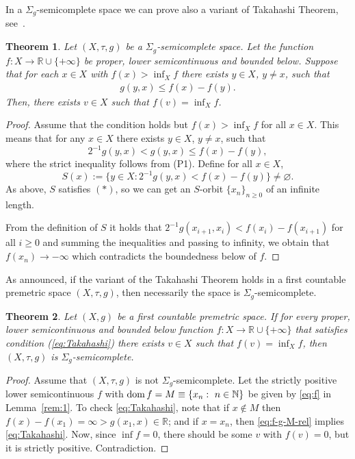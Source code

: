 \documentclass[12pt]{article}
\newtheorem{theorem}{Theorem}[section]
\def\dom{\mathop{\rm dom}}
\newcommand{\R}{\mathbb{R}}
\begin{document}
In a $\Sigma_g$-semicomplete space we can prove also a variant of Takahashi Theorem, see~\cite{Takahashi}.

\begin{theorem}\label{th:Takahashi} Let $(X,\tau,g)$ be a $\Sigma_g$-semicomplete space. Let the function $f: X \rightarrow \R \cup \{+\infty\}$ be proper, lower semicontinuous and bounded below. Suppose that for each $x \in X$ with $f(x) > \inf_X f$ there exists $y \in X$, $y \neq x$, such that
\begin{eqnarray}
g(y,x) \leq f(x)-f(y). \label{eq:Takahashi}
\end{eqnarray}
Then, there exists $v \in X$ such that $f(v)=\inf_X f$.
\end{theorem}

\begin{proof}
Assume that the condition holds but $f(x) > \inf_X f$ for all $x \in X$. This means that for any $x\in X$  there exists $y \in X$, $y \neq x$, such that
\[
2^{-1}g(y,x) < g(y,x)\leq f(x)-f(y),
\]
where the strict inequality follows from (P1).
 Define for all $x \in X$,
\[S(x):=\{y \in X: 2^{-1}g(y,x) < f(x)-f(y)\} \neq \varnothing.\]
As above, $S$ satisfies $(\ast)$, so we can get an $S$-orbit $\{x_n\}_{n\ge0}$ of an infinite length.

From the definition of $S$ it holds that $2^{-1}g(x_{i+1},x_{i})<f(x_i)-f(x_{i+1})$ for all $i\ge 0$ and summing the inequalities and passing to infinity, we obtain that $f(x_n) \rightarrow -\infty$ which contradicts the boundedness below of $f$.
\end{proof}

As announced,  if the variant of the Takahashi Theorem  holds  in a first countable premetric space $(X,\tau,g)$, then necessarily the space is $\Sigma_g$-semicomplete.


\begin{theorem} \label{Takahashi invers}
Let $(X,g)$ be a first countable premetric space. If for every proper, lower semicontinuous and bounded below function $f: X \rightarrow \R \cup \{+\infty\}$ that satisfies  condition (\ref{eq:Takahashi}) there exists $v \in X$ such that $f(v)=\inf_X f$, then $(X,\tau,g)$ is   $\Sigma_g$-semicomplete.
\end{theorem}
\begin{proof} Assume that $(X,\tau,g)$ is   not $\Sigma_g$-semicomplete.
Let the strictly positive lower semicontinuous $f$ with $\dom f = M\equiv \{x_n:\ n\in\mathbb{N}\}$ be given by \eqref{eq:f} in Lemma~\ref{rem:1}. To check \eqref{eq:Takahashi}, note that if $x\notin M$ then $f(x) - f(x_1) = \infty > g(x_1,x)\in\mathbb{R}$; and if $x=x_n$, then \eqref{eq:f-g-M-rel} implies \eqref{eq:Takahashi}. Now, since $\inf f = 0$, there should be some $v$ with $f(v)=0$, but it is strictly positive.  Contradiction.
\end{proof}
\end{document}
